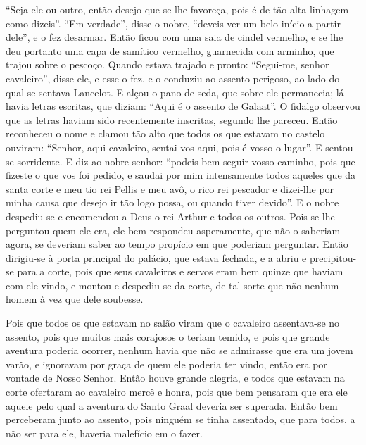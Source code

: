 “Seja ele ou outro, então desejo que se lhe favoreça, pois é de tão alta
linhagem como dizeis”. “Em verdade”, disse o nobre, “deveis ver um belo início
a partir dele”, e o fez desarmar. Então ficou com uma saia de cindel vermelho,
e se lhe deu portanto uma capa de samítico vermelho, guarnecida com arminho,
que trajou sobre o pescoço. Quando estava trajado e pronto: “Segui-me, senhor
cavaleiro”, disse ele, e esse o fez, e o conduziu ao assento perigoso, ao lado
do qual se sentava Lancelot. E alçou o pano de seda, que sobre ele permanecia;
lá havia letras escritas, que diziam: “Aqui é o assento de Galaat”. O fidalgo
observou que as letras haviam sido recentemente inscritas, segundo lhe pareceu.
Então reconheceu o nome e clamou tão alto que todos os que estavam no castelo
ouviram: “Senhor, aqui cavaleiro, sentai-vos aqui, pois é vosso o lugar”. E
sentou-se sorridente. E diz ao nobre senhor: “podeis bem seguir vosso caminho,
pois que fizeste o que vos foi pedido, e saudai por mim intensamente todos
aqueles que da santa corte e meu tio rei Pellis e meu avô, o rico rei pescador
e dizei-lhe por minha causa que desejo ir tão logo possa, ou quando tiver
devido”. E o nobre despediu-se e encomendou a Deus o rei Arthur e todos os
outros.  Pois se lhe perguntou quem ele era, ele bem respondeu asperamente, que
não o saberiam agora, se deveriam saber ao tempo propício em que poderiam
perguntar. Então dirigiu-se à porta principal do palácio, que estava fechada, e
a abriu e precipitou-se para a corte, pois que seus cavaleiros e servos eram
bem quinze que haviam com ele vindo, e montou e despediu-se da corte, de tal
sorte que não nenhum homem à vez que dele soubesse. 

Pois que todos os que estavam no salão viram que o cavaleiro assentava-se no
assento, pois que muitos mais corajosos o teriam temido, e pois que grande
aventura poderia ocorrer, nenhum havia que não se admirasse que era um jovem
varão, e ignoravam por graça de quem ele poderia ter vindo, então era por
vontade de Nosso Senhor. Então houve grande alegria, e todos que estavam na
corte ofertaram ao cavaleiro mercê e honra, pois que bem pensaram que era ele
aquele pelo qual a aventura do Santo Graal deveria ser superada. Então
bem perceberam junto ao assento, pois ninguém se tinha assentado, que para
todos, a não ser para ele, haveria malefício em o fazer. 

